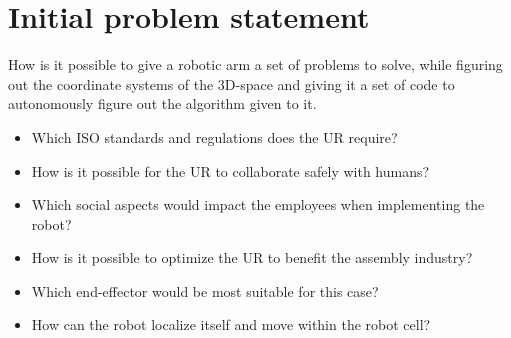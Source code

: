 \chapter{Initial problem statement}\label{ch:Initial problem statment}
How is it possible to give a robotic arm a set of problems to solve, while figuring out the
coordinate systems of the 3D-space and giving it a set of code to autonomously figure out the algorithm given to it.\\

\begin{itemize}
    \item Which ISO standards and regulations does the UR require?
    \item How is it possible for the UR to collaborate safely with humans?
    \item Which social aspects would impact the employees when implementing the robot?
    \item How is it possible to optimize the UR to benefit the assembly industry?
    \item Which end-effector would be most suitable for this case?
    \item How can the robot localize itself and move within the robot cell?
\end{itemize}